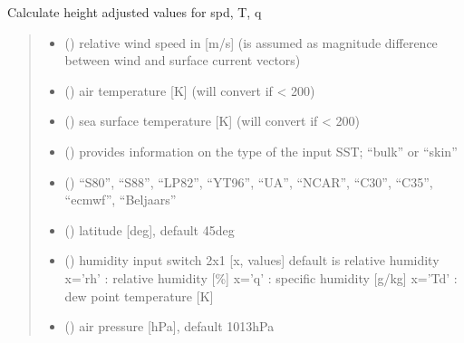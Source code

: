 \documentclass[letterpaper,10pt,english]{sphinxmanual}
\begin{document}
\begin{fulllineitems}
\sphinxAtStartPar
Calculate height adjusted values for spd, T, q
\begin{quote}\begin{description}
\begin{itemize}
\item {} 
\sphinxAtStartPar
{} () \textendash{} relative wind speed in {[}m/s{]} (is assumed as magnitude difference
between wind and surface current vectors)

\item {} 
\sphinxAtStartPar
{} () \textendash{} air temperature {[}K{]} (will convert if \textless{} 200)

\item {} 
\sphinxAtStartPar
{} () \textendash{} sea surface temperature {[}K{]} (will convert if \textless{} 200)

\item {} 
\sphinxAtStartPar
{} () \textendash{} provides information on the type of the input SST; “bulk” or
“skin”

\item {} 
\sphinxAtStartPar
{} () \textendash{} “S80”, “S88”, “LP82”, “YT96”, “UA”, “NCAR”, “C30”, “C35”,
“ecmwf”, “Beljaars”

\item {} 
\sphinxAtStartPar
{} () \textendash{} latitude {[}deg{]}, default 45deg

\item {} 
\sphinxAtStartPar
{} () \textendash{} humidity input switch 2x1 {[}x, values{]} default is relative humidity
x=’rh’ : relative humidity {[}\%{]}
x=’q’ : specific humidity {[}g/kg{]}
x=’Td’ : dew point temperature {[}K{]}

\item {} 
\sphinxAtStartPar
{} () \textendash{} air pressure {[}hPa{]}, default 1013hPa


\end{itemize}
\end{description}
\end{quote}
\end{fulllineitems}
\end{document}
